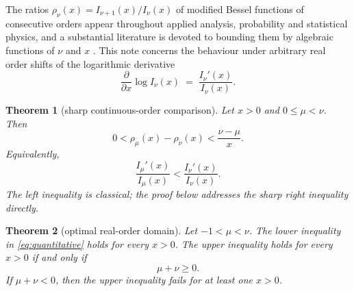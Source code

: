 \documentclass[11pt]{article}
\newtheorem{theorem}{Theorem}
\theoremstyle{remark}
\begin{document}
The ratios $\rho_\nu(x) = I_{\nu+1}(x)/I_\nu(x)$ of modified Bessel
functions of consecutive orders appear throughout applied analysis,
probability and statistical physics, and a substantial literature is
devoted to bounding them by algebraic functions of $\nu$ and $x$
\cite{Amos, Nasell, Segura2011, HornikGrun, RuizSegura, Segura2023}.
This note concerns the behaviour under arbitrary real order shifts of the logarithmic
derivative
\[
\frac{\partial}{\partial x} \log I_\nu(x) \;=\; \frac{I_\nu'(x)}{I_\nu(x)}.
\]

\begin{theorem}[sharp continuous-order comparison]
\label{thm:main}
Let $x>0$ and $0\le \mu<\nu$.  Then
\begin{equation}
\label{eq:quantitative}
0<\rho_\mu(x)-\rho_\nu(x)<\frac{\nu-\mu}{x}.
\end{equation}
Equivalently,
\begin{equation}
\label{eq:continuouslog}
\frac{I_\mu'(x)}{I_\mu(x)}<\frac{I_\nu'(x)}{I_\nu(x)}.
\end{equation}
The left inequality is classical; the proof below addresses the sharp
right inequality directly.
\end{theorem}

\begin{theorem}[optimal real-order domain]
\label{thm:domain}
Let $-1<\mu<\nu$.  The lower inequality in
\eqref{eq:quantitative} holds for every $x>0$.  The upper inequality
holds for every $x>0$ if and only if
\[
  \mu+\nu\ge0.
\]
If $\mu+\nu<0$, then the upper inequality fails for at least one
$x>0$.
\end{theorem}
\end{document}
